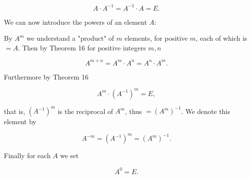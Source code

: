 $$A \cdot A^{-1} = A^{-1} \cdot A = E.$$

We can now introduce the powers of an element $A$:

By $A^m$ we understand a "product" of $m$ elements, for positive $m$, each of which is $= A$. Then by Theorem 16 for positive integers $m, n$

$$A^{m+n} = A^m \cdot A^n = A^n \cdot A^m.$$

Furthermore by Theorem 16

$$A^m \cdot (A^{-1})^m = E,$$

that is, $(A^{-1})^m$ is the reciprocal of $A^m$, thus $=(A^m)^{-1}$. We denote this element by

$$A^{-m} = (A^{-1})^m = (A^m)^{-1}.$$

Finally for each $A$ we set

$$A^0 = E.$$
